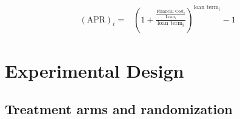 \documentclass[11pt, a4paper]{article}
\begin{document}
\begin{align*}
    (\text{APR})_i =&\left( 1 + \frac{\frac{\text{Financial Cost}_i}{\text{Loan}_i}}{\text{loan term}_i}\right)^{\text{loan term}_i}-1 
\end{align*}






\section{Experimental Design} \label{Design}

\vspace{.2in}
\subsection{Treatment arms and randomization}
\end{document}
